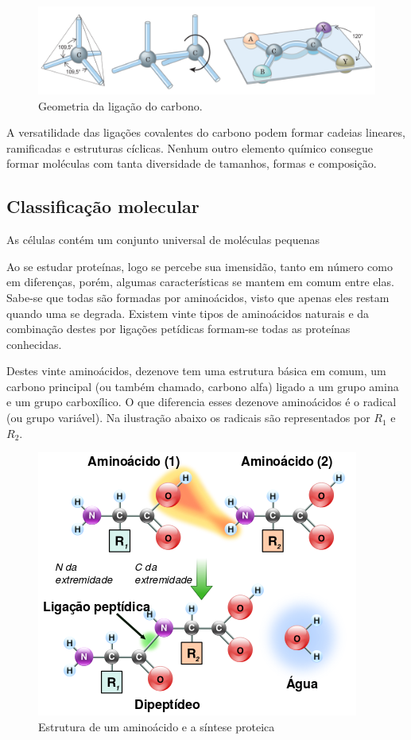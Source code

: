 \documentclass[a4paper,12pt]{article}
\begin{document}
	\begin{figure}[H]
		\begin{center}
			\includegraphics[width=1\linewidth]{carbono.png}
		\end{center}
		\caption{Geometria da ligação do carbono.}
		\label{fig:carbono}
	\end{figure}

	A versatilidade das ligações covalentes do carbono podem formar cadeias lineares, ramificadas e estruturas cíclicas. Nenhum outro elemento químico consegue formar moléculas com tanta diversidade de tamanhos, formas e composição.
	
	\subsection{Classificação molecular}
	As células contém um conjunto universal de moléculas pequenas
	
	
	
	Ao se estudar proteínas, logo se percebe sua imensidão, tanto em número como em diferenças, porém, algumas características se mantem em comum entre elas. Sabe-se que todas são formadas por aminoácidos, visto que apenas eles restam quando uma se degrada. Existem vinte tipos de aminoácidos naturais e da combinação destes por ligações petídicas formam-se todas as proteínas conhecidas. \cite{fidalgotese}
	
	Destes vinte aminoácidos, dezenove tem uma estrutura básica em comum, um carbono principal (ou também chamado, carbono alfa) ligado a um grupo amina e um grupo carboxílico. O que diferencia esses dezenove aminoácidos é o radical (ou grupo variável). Na ilustração abaixo os radicais são representados por $R_1$ e $R_2$.
	\\
	\begin{figure}[H]
		\begin{center}
			\includegraphics[width=0.6\linewidth]{Peptidformation.png}
		\end{center}
		\caption{Estrutura de um aminoácido e a síntese proteica}
		\label{}
	\end{figure}
	
\end{document}
